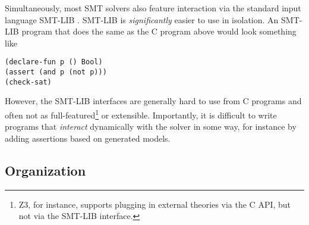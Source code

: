 Simultaneously, most SMT solvers also feature interaction via the standard input
language SMT-LIB \cite{smtlib2:10}. SMT-LIB is \textit{significantly} easier to
use in isolation. An SMT-LIB program that does the same as the C program above
would look something like

\begin{verbatim}
(declare-fun p () Bool)
(assert (and p (not p)))
(check-sat)
\end{verbatim}

However, the SMT-LIB interfaces are generally hard to use from C programs and
often not as full-featured\footnote{Z3, for instance, supports plugging in
  external theories via the C API, but not via the SMT-LIB interface.} or
extensible. Importantly, it is difficult to write programs that
\textit{interact} dynamically with the solver in some way, for instance by
adding assertions based on generated models.

\subsection{Organization}
